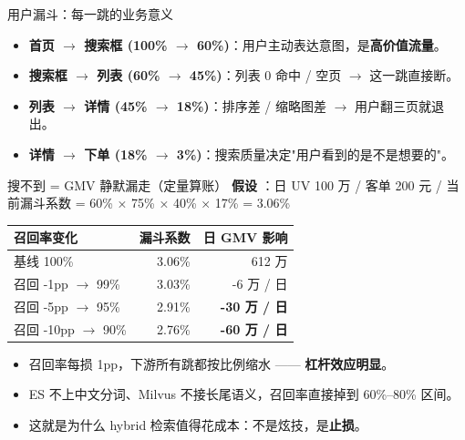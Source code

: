 \documentclass[aspectratio=169,11pt]{beamer}
\begin{document}
\begin{frame}[shrink]{用户漏斗：每一跳的业务意义}
\vspace{2mm}
\begin{itemize}
  \item \textbf{首页 $\to$ 搜索框 (100\% $\to$ 60\%)}：用户主动表达意图，是\textbf{高价值流量}。
  \item \textbf{搜索框 $\to$ 列表 (60\% $\to$ 45\%)}：列表 0 命中 / 空页 $\to$ 这一跳直接断。
  \item \textbf{列表 $\to$ 详情 (45\% $\to$ 18\%)}：排序差 / 缩略图差 $\to$ 用户翻三页就退出。
  \item \textbf{详情 $\to$ 下单 (18\% $\to$ 3\%)}：搜索质量决定"用户看到的是不是想要的"。
\end{itemize}
\end{frame}

\begin{frame}[shrink]{搜不到 = GMV 静默漏走（定量算账）}
\textbf{假设} ：日 UV 100 万 / 客单 200 元 / 当前漏斗系数 = 60\% × 75\% × 40\% × 17\% = 3.06\%
\vspace{1mm}
\begin{tabular}{@{}lrr@{}}
\toprule
召回率变化         & 漏斗系数      & 日 GMV 影响      \\
\midrule
基线 100\%        & 3.06\%       & 612 万          \\
召回 -1pp $\to$ 99\% & 3.03\%       & -6 万 / 日      \\
召回 -5pp $\to$ 95\% & 2.91\%       & \textbf{-30 万 / 日} \\
召回 -10pp $\to$ 90\% & 2.76\%       & \textbf{-60 万 / 日} \\
\bottomrule
\end{tabular}
\vspace{2mm}
\begin{itemize}
  \item 召回率每损 1pp，下游所有跳都按比例缩水 —— \textbf{杠杆效应明显}。
  \item ES 不上中文分词、Milvus 不接长尾语义，召回率直接掉到 60\%--80\% 区间。
  \item 这就是为什么 hybrid 检索值得花成本：不是炫技，是\textbf{止损}。
\end{itemize}
\end{frame}
\end{document}
